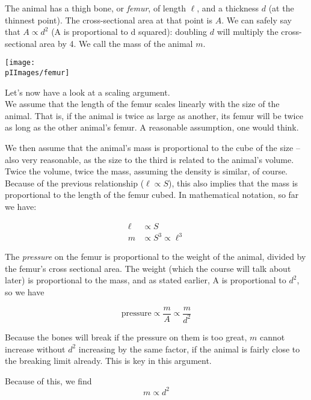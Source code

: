 The animal has a thigh bone, or \emph{femur}, of length $\ell$, and a thickness $d$ (at the thinnest point). The cross-sectional area at that point is $A$. We can safely say that $A \propto d^2$ (A is proportional to d squared): doubling $d$ will multiply the cross-sectional area by 4.
We call the mass of the animal $m$.

\begin{center}
\texttt{[image: \\pIImages/femur]}
\end{center}

Let's now have a look at a scaling argument.\\
We assume that the length of the femur scales linearly with the size of the animal. That is, if the animal is twice as large as another, its femur will be twice as long as the other animal's femur. A reasonable assumption, one would think.

We then assume that the animal's mass is proportional to the cube of the size -- also very reasonable, as the size to the third is related to the animal's volume. Twice the volume, twice the mass, assuming the density is similar, of course.\\
Because of the previous relationship ($\ell \propto S$), this also implies that the mass is proportional to the length of the femur cubed. In mathematical notation, so far we have:

\begin{align}
 \ell &\propto S \label{eq:lproptoS}\\
 m &\propto S^3 \propto \ell^3 \label{eq:mproptoS3}
\end{align}

The \emph{pressure} on the femur is proportional to the weight of the animal, divided by the femur's cross sectional area. The weight (which the course will talk about later) is proportional to the mass, and as stated earlier, A is proportional to $d^2$, so we have

\begin{equation}
 \text{pressure} \propto \frac{m}{A} \propto \frac{m}{d^2}
\end{equation}

Because the bones will break if the pressure on them is too great, $m$ cannot increase without $d^2$ increasing by the same factor, if the animal is fairly close to the breaking limit already. This is key in this argument.

Because of this, we find
\begin{equation}
m \propto d^2 \label{eq:mproptod2}
\end{equation}

